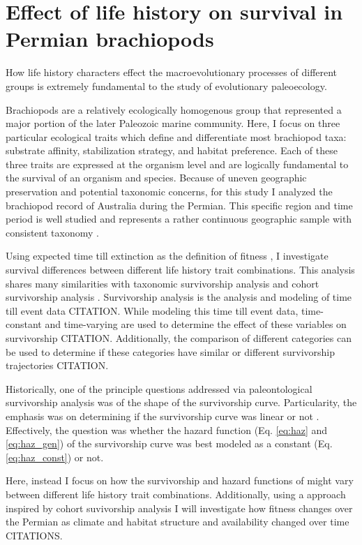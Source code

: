 \documentclass[12pt,letterpaper]{article}
\begin{document}
\section{Effect of life history on survival in Permian brachiopods}

How life history characters effect the macroevolutionary processes of different groups is extremely fundamental to the study of evolutionary paleoecology.

Brachiopods are a relatively ecologically homogenous group that represented a major portion of the later Paleozoic marine community. Here, I focus on three particular ecological traits which define and differentiate most brachiopod taxa: substrate affinity, stabilization strategy, and habitat preference. Each of these three traits are expressed at the organism level and are logically fundamental to the survival of an organism and species. Because of uneven geographic preservation and potential taxonomic concerns, for this study I analyzed the brachiopod record of Australia during the Permian. This specific region and time period is well studied and represents a rather continuous geographic sample with consistent taxonomy \citep{Clapham2008a,Clapham2012,Clapham2007}.

Using expected time till extinction as the definition of fitness \citep{Cooper1984}, I investigate survival differences between different life history trait combinations. This analysis shares many similarities with taxonomic survivorship analysis \citep{VanValen1973,VanValen1979} and cohort survivorship analysis \citep{Raup1978}. Survivorship analysis is the analysis and modeling of time till event data CITATION. While modeling this time till event data, time-constant and time-varying are used to determine the effect of these variables on survivorship CITATION. Additionally, the comparison of different categories can be used to determine if these categories have similar or different survivorship trajectories CITATION.

Historically, one of the principle questions addressed via paleontological survivorship analysis was of the shape of the survivorship curve. Particularity, the emphasis was on determining if the survivorship curve was linear or not \citep{VanValen1973,Raup1975,Sepkoski1975,Pearson1992,Kitchell1991}. Effectively, the question was whether the hazard function (Eq. \ref{eq:haz} and \ref{eq:haz_gen}) of the survivorship curve was best modeled as a constant (Eq. \ref{eq:haz_const}) or not.

Here, instead I focus on how the survivorship and hazard functions of might vary between different life history trait combinations. Additionally, using a approach inspired by cohort suvivorship analysis \citep{Raup1975} I will investigate how fitness changes over the Permian as climate and habitat structure and availability changed over time CITATIONS.
\end{document}
